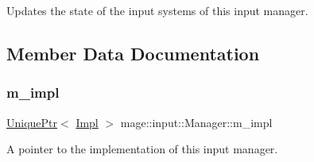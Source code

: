 Updates the state of the input systems of this input manager. 

\subsection{Member Data Documentation}
\mbox{\label{classmage_1_1input_1_1_manager_ae404d608b787f264c0d5e8cf24aacf98}} 
\subsubsection{\texorpdfstring{m\+\_\+impl}{m\_impl}}
{\footnotesize\ttfamily \mbox{\hyperlink{namespacemage_a3316d7143a973e37adf1110f2e80ca31}{Unique\+Ptr}}$<$ \mbox{\hyperlink{classmage_1_1input_1_1_manager_1_1_impl}{Impl}} $>$ mage\+::input\+::\+Manager\+::m\+\_\+impl\hspace{0.3cm}{\ttfamily [private]}}

A pointer to the implementation of this input manager. 